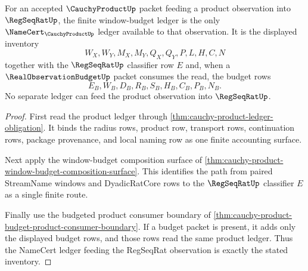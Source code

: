 \begin{theorem}
\label{thm:cauchy-product-window-budget-namecert-ledger}
For an accepted $\CauchyProductUp$ packet feeding a product observation into $\RegSeqRatUp$, the finite window-budget ledger is the only $\NameCert_{\CauchyProductUp}$ ledger available to that observation. It is the displayed inventory
$$
W_X,W_Y,M_X,M_Y,Q_X,Q_Y,P,L,H,C,N
$$
together with the $\RegSeqRatUp$ classifier row $E$ and, when a $\RealObservationBudgetUp$ packet consumes the read, the budget rows
$$
E_B,W_B,D_B,R_B,S_B,H_B,C_B,P_B,N_B.
$$
No separate ledger can feed the product observation into $\RegSeqRatUp$.
\end{theorem}
\begin{proof}
First read the product ledger through \autoref{thm:cauchy-product-ledger-obligation}. It binds the radius rows, product row, transport rows, continuation rows, package provenance, and local naming row as one finite accounting surface.

Next apply the window-budget composition surface of \autoref{thm:cauchy-product-window-budget-composition-surface}. This identifies the path from paired StreamName windows and DyadicRatCore rows to the $\RegSeqRatUp$ classifier $E$ as a single finite route.

Finally use the budgeted product consumer boundary of \autoref{thm:cauchy-product-budget-product-consumer-boundary}. If a budget packet is present, it adds only the displayed budget rows, and those rows read the same product ledger. Thus the NameCert ledger feeding the RegSeqRat observation is exactly the stated inventory.
\end{proof}

